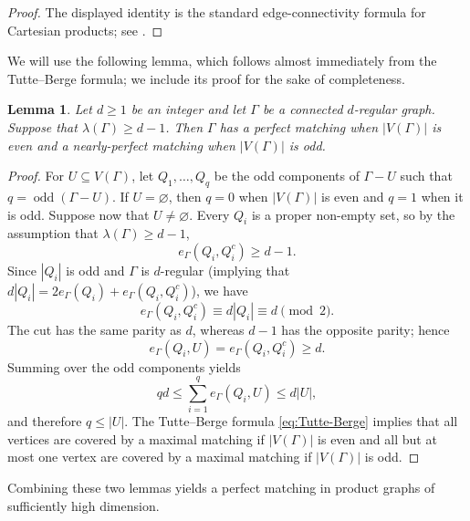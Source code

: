 \documentclass[10pt,a4paper]{article}
\newtheorem{lemma}[thm]{Lemma}
\newcommand{\odd}{\operatorname{odd}}
\begin{document}
\begin{proof}
The displayed identity is the standard edge-connectivity formula for Cartesian products; see \cite[Chapter~5]{HIK11}.
\end{proof}


We will use the following lemma, which follows almost immediately from the Tutte--Berge formula; we include its proof for the sake of completeness.
\begin{lemma}\label{lem:regular-matching}
Let $d \geq 1$ be an integer and let $\Gamma$ be a connected $d$-regular graph. Suppose that $\lambda(\Gamma)\ge d-1$.
Then $\Gamma$ has a perfect matching when $|V(\Gamma)|$ is even and a nearly-perfect matching when $|V(\Gamma)|$ is odd.
\end{lemma}

\begin{proof}
For $U\subseteq V(\Gamma)$, let $Q_1,\ldots,Q_q$ be the odd components of $\Gamma-U$ such that $q=\odd(\Gamma - U)$.
If $U=\varnothing$, then $q=0$ when $|V(\Gamma)|$ is even and $q=1$ when it is odd.
Suppose now that $U\ne\varnothing$.
Every $Q_i$ is a proper non-empty set, so by the assumption that $\lambda(\Gamma)\geq d-1$,
\[
  e_\Gamma(Q_i,Q_i^c)\ge d-1.
\]
Since $|Q_i|$ is odd and $\Gamma$ is $d$-regular (implying that $d|Q_i|= 2 e_{\Gamma}(Q_i) + e_{\Gamma}(Q_i, Q_i^c)$), we have
\[
  e_\Gamma(Q_i,Q_i^c)\equiv d|Q_i|\equiv d\pmod 2.
\]
The cut has the same parity as $d$, whereas $d-1$ has the opposite parity; hence
\[
  e_\Gamma(Q_i,U)=e_\Gamma(Q_i,Q_i^c)\ge d.
\]
Summing over the odd components yields
\[
  qd\le\sum_{i=1}^q e_\Gamma(Q_i,U)\le d|U|,
\]
and therefore $q\le|U|$.
The Tutte--Berge formula \eqref{eq:Tutte-Berge} implies that all vertices are covered by a maximal matching if $|V(\Gamma)|$ is even and all but at most one vertex are covered by a maximal matching if $|V(\Gamma)|$ is odd.
\end{proof}

Combining these two lemmas yields a perfect matching in product graphs of sufficiently high dimension.
\end{document}

